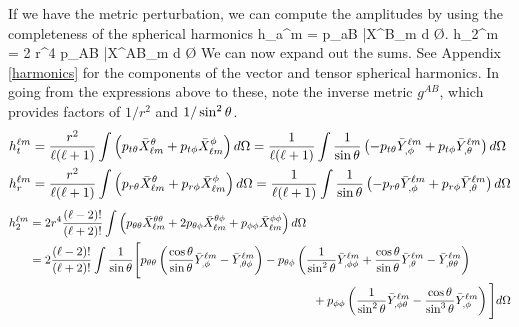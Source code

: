 \documentclass{article}
\begin{document}
If we have the metric perturbation, we can compute the amplitudes
by using the completeness of the spherical harmonics
\be
h_a^{\ell m} 
=  \int p_{aB} \bar{X}^{B}_{\ell m} d \O.
\ee
\be
 h_2^{\ell m}
=
2 r^{4}  
\int p_{AB} \bar{X}^{AB}_{\ell m} d \O
\ee
We can now expand out the sums. See Appendix \ref{harmonics} for the components
of the vector and tensor spherical harmonics. In going from the expressions
above to these, 
note the inverse metric $g^{AB}$, which provides factors of $1/r^{2}$ and 
$1 / \sin^{2} \theta$.
\begin{align}
h_t^{\ell m} 
&= \frac{r^{2}}{\ell (\ell+1)}  
\int 
\left( p_{t \theta} \bar{X}^{\theta}_{\ell m} 
+ p_{t \phi} \bar{X}^{\phi}_{\ell m} \right) d \Omega 
= 
\frac{1}{\ell (\ell+1)}  
\int 
\frac{1}{\sin \theta}
\left( - p_{t \theta} \bar{Y}^{\ell m}_{, \phi}
+ p_{t \phi}  \bar{Y}^{\ell m}_{, \theta} \right) d \Omega 
\\
h_r^{\ell m} 
&= \frac{r^{2}}{\ell (\ell+1)}  
\int 
\left( p_{r \theta} \bar{X}^{\theta}_{\ell m} 
+ p_{r \phi} \bar{X}^{\phi}_{\ell m} \right) d \Omega 
= 
\frac{1}{\ell (\ell+1)}  
\int 
\frac{1}{\sin \theta}
\left( - p_{r \theta} \bar{Y}^{\ell m}_{, \phi}
+ p_{r \phi}  \bar{Y}^{\ell m}_{, \theta} \right) d \Omega 
\end{align}
\begin{align}
h_2^{\ell m} 
&= 
2 r^{4} \frac{(\ell-2)!}{(\ell+2)!} 
\int 
\l 
p_{\th \th} \bar{X}^{\th \th}_{\ell m} 
+
2 p_{\th \phi} \bar{X}^{\th \phi}_{\ell m} 
+
p_{\phi \phi} \bar{X}^{\phi \phi}_{\ell m} 
\r
d \O \\
& =
2 \frac{(\ell-2)!}{(\ell+2)!} 
\int 
 \frac{1}{\sin \th}
\Bigg[ 
p_{\th \th} 
\l 
  \frac{\cos \th}{\sin \th} \bar{Y}^{\ell m}_{, \phi}
 - \bar{Y}^{\ell m}_{, \th \phi}
 \r
 -
 p_{\th \phi} 
\l
 \frac{1}{\sin^{2} \th} \bar{Y}^{\ell m}_{, \phi \phi}
 + \frac{\cos \th}{\sin \th} \bar{Y}^{\ell m}_{, \th }
 - \bar{Y}^{\ell m}_{, \th \th}
\r \nonumber
\\
& \hspace{55ex} +
p_{\phi \phi} 
 \l
 \frac{1}{\sin^{2} \th}
\bar{Y}^{\ell m}_{, \phi \th}
- \frac{\cos \th}{\sin^{3} \th} \bar{Y}^{\ell m}_{, \phi}
\r
\Bigg]
d \O 
\end{align}
\end{document}
